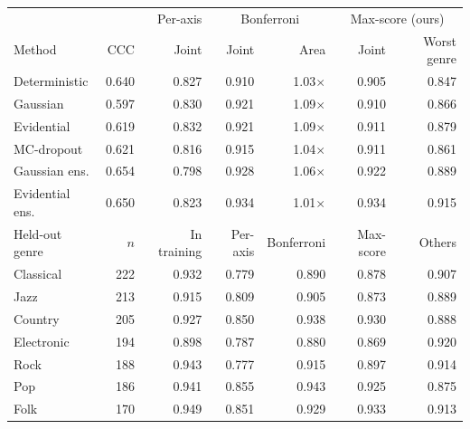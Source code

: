 \begin{tabular}{lrrrrrr}
\toprule
 & & Per-axis & \multicolumn{2}{c}{Bonferroni} & \multicolumn{2}{c}{Max-score (ours)} \\
Method & CCC & Joint & Joint & Area & Joint & Worst genre \\
\midrule
Deterministic & 0.640 & 0.827 & 0.910 & 1.03$\times$ & 0.905 & 0.847 \\
Gaussian & 0.597 & 0.830 & 0.921 & 1.09$\times$ & 0.910 & 0.866 \\
Evidential & 0.619 & 0.832 & 0.921 & 1.09$\times$ & 0.911 & 0.879 \\
MC-dropout & 0.621 & 0.816 & 0.915 & 1.04$\times$ & 0.911 & 0.861 \\
Gaussian ens. & 0.654 & 0.798 & 0.928 & 1.06$\times$ & 0.922 & 0.889 \\
Evidential ens. & 0.650 & 0.823 & 0.934 & 1.01$\times$ & 0.934 & 0.915 \\
\midrule
Held-out genre & $n$ & In training & Per-axis & Bonferroni & Max-score & Others \\
\midrule
Classical & 222 & 0.932 & 0.779 & 0.890 & 0.878 & 0.907 \\
Jazz & 213 & 0.915 & 0.809 & 0.905 & 0.873 & 0.889 \\
Country & 205 & 0.927 & 0.850 & 0.938 & 0.930 & 0.888 \\
Electronic & 194 & 0.898 & 0.787 & 0.880 & 0.869 & 0.920 \\
Rock & 188 & 0.943 & 0.777 & 0.915 & 0.897 & 0.914 \\
Pop & 186 & 0.941 & 0.855 & 0.943 & 0.925 & 0.875 \\
Folk & 170 & 0.949 & 0.851 & 0.929 & 0.933 & 0.913 \\
\bottomrule
\end{tabular}
